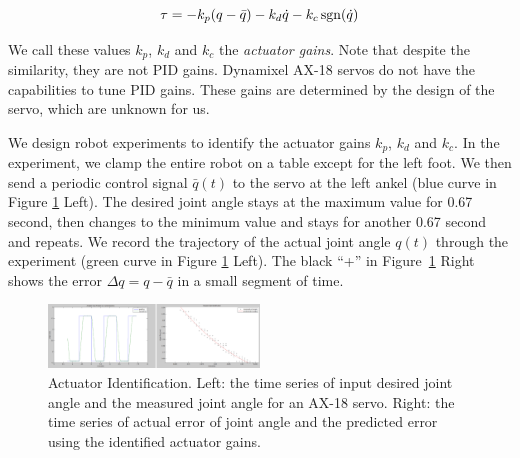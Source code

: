 \begin{equation}
  \tau = -k_p(q-\bar{q}) - k_d\dot{q} - k_c\operatorname{sgn}(\dot{q})\\
    \label{eqn:torqueErrorRelationSimple}
\end{equation}

We call these values $k_p$, $k_d$ and $k_c$ the \emph{actuator gains}. Note that despite the similarity, they are not PID gains. Dynamixel AX-18 servos do not have the capabilities to tune PID gains. These gains are determined by the design of the servo, which are unknown for us.

We design robot experiments to identify the actuator gains $k_p$, $k_d$ and $k_c$. In the experiment, we clamp the entire robot on a table except for the left foot. We then send a periodic control signal $\bar{q}(t)$ to the servo at the left ankel (blue curve in Figure \ref{fig:actuatorId} Left). The desired joint angle stays at the maximum value for 0.67 second, then changes to the minimum value and stays for another 0.67 second and repeats. We record the trajectory of the actual joint angle $q(t)$ through the experiment (green curve in Figure \ref{fig:actuatorId} Left). The black ``+'' in Figure~\ref{fig:actuatorId} Right shows the error $\Delta q = q-\bar{q}$ in a small segment of time.

\begin{figure}[!t]
  \centering
  \includegraphics[width=0.5\textwidth]{figures/actuatorId}
  \caption{Actuator Identification. Left: the time series of input desired joint angle and the measured joint angle for an AX-18 servo. Right: the time series of actual error of joint angle and the predicted error using the identified actuator gains.  }
  \label{fig:actuatorId}
\end{figure}

